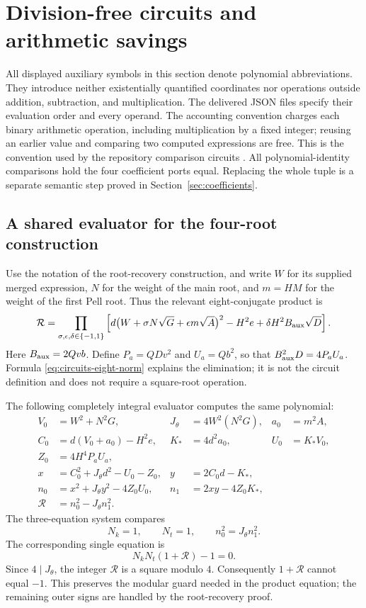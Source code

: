 \section{Division-free circuits and arithmetic savings}
\label{sec:circuits}

All displayed auxiliary symbols in this section denote polynomial
abbreviations. They introduce neither existentially quantified coordinates
nor operations outside addition, subtraction, and multiplication.
The delivered JSON files specify their evaluation order and every operand.
The accounting convention charges each binary arithmetic operation, including
multiplication by a fixed integer; reusing an earlier value and comparing two
computed expressions are free. This is the convention used by the repository
comparison circuits \cite{repo21,repo22}.
All polynomial-identity comparisons hold the four coefficient ports equal.
Replacing the whole tuple is a separate semantic step proved in
Section~\ref{sec:coefficients}.

\subsection{A shared evaluator for the four-root construction}

Use the notation of the root-recovery construction, and write $W$ for its
supplied merged expression, $N$ for the weight of the main root, and $m=HM$
for the weight of the first Pell root. Thus the relevant eight-conjugate
product is
\begin{equation}
\mathcal R=
\prod_{\sigma,\epsilon,\delta\in\{-1,1\}}
\left[d\bigl(W+\sigma N\sqrt G+\epsilon m\sqrt A\bigr)^2
      -H^2e+\delta H^2B_{\rm aux}\sqrt D\right].
\label{eq:circuits-eight-norm}
\end{equation}
Here $B_{\rm aux}=2Qvb$. Define $P_a=QDv^2$ and $U_a=Qb^2$,
so that $B_{\rm aux}^2D=4P_aU_a$. Formula \eqref{eq:circuits-eight-norm} explains the elimination;
it is not the circuit definition and does not require a square-root operation.

The following completely integral evaluator computes the same polynomial:
\begin{align*}
 V_0&=W^2+N^2G,& J_\theta&=4W^2(N^2G),& a_0&=m^2A,\\
 C_0&=d(V_0+a_0)-H^2e,& K_*&=4d^2a_0,& U_0&=K_*V_0,\\
 Z_0&=4H^4P_aU_a,\\
 x&=C_0^2+J_\theta d^2-U_0-Z_0,
 &y&=2C_0d-K_*,\\
 n_0&=x^2+J_\theta y^2-4Z_0U_0,
 &n_1&=2xy-4Z_0K_*,\\
 \mathcal R&=n_0^2-J_\theta n_1^2.
\end{align*}
The three-equation system compares
\[
 N_k=1,\qquad N_t=1,\qquad n_0^2=J_\theta n_1^2.
\]
The corresponding single equation is
\[
 N_kN_t(1+\mathcal R)-1=0.
\]
Since $4\mid J_\theta$, the integer $\mathcal R$ is a square modulo $4$.
Consequently $1+\mathcal R$ cannot equal $-1$. This preserves the modular
guard needed in the product equation; the remaining outer signs are handled
by the root-recovery proof.

